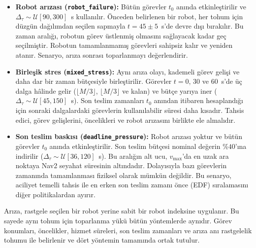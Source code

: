\documentclass[10pt,letterpaper,onecolumn]{IEEEtran}
\begin{document}
\begin{itemize}
  \item \textbf{Robot arızası (\texttt{robot\_failure}):} Bütün görevler
        $t_0$ anında etkinleştirilir ve
        $\Delta_\tau\sim\mathcal U[90,300]$~s kullanılır. Önceden belirlenen
        bir robot, her tohum için düzgün dağılımdan seçilen sapmayla
        $t=45\pm5$~s'de devre dışı bırakılır. Bu zaman aralığı, robotun görev
        üstlenmiş olmasını sağlayacak kadar geç seçilmiştir. Robotun
        tamamlanmamış görevleri sahipsiz kalır ve yeniden atanır. Senaryo,
        arıza sonrası toparlanmayı değerlendirir.

  \item \textbf{Birleşik stres (\texttt{mixed\_stress}):} Aynı arıza olayı,
        kademeli görev gelişi ve daha dar bir zaman bütçesiyle birleştirilir.
        Görevler $t=0$, $30$ ve $60$~s'de üç dalga
        hâlinde gelir ($\lfloor M/3\rfloor$, $\lfloor M/3\rfloor$ ve kalan)
        ve bütçe yarıya iner ($\Delta_\tau\sim\mathcal U[45,150]$~s).
        Son teslim zamanları $t_0$ anından itibaren hesaplandığı için sonraki
        dalgalardaki görevlerin kullanılabilir süresi daha kısadır. Tahsis
        edici, görev gelişlerini, öncelikleri ve robot arızasını birlikte ele
        almalıdır.

  \item \textbf{Son teslim baskısı (\texttt{deadline\_pressure}):} Robot
        arızası yoktur ve bütün görevler $t_0$ anında etkinleştirilir. Son
        teslim bütçesi nominal değerin $\%40$'ına indirilir
        ($\Delta_\tau\sim\mathcal U[36,120]$~s). Bu aralığın alt ucu,
        $v_{\max}$'da en uzak ara noktaya Nav2 seyahat süresinin altındadır.
        Dolayısıyla bazı görevlerin zamanında tamamlanması fiziksel olarak
        mümkün değildir. Bu senaryo, aciliyet temelli tahsis ile en erken son
        teslim zamanı önce (EDF) sıralamasını diğer politikalardan ayırır.
\end{itemize}

Arıza, rastgele seçilen bir robot yerine sabit bir robot indeksine uygulanır.
Bu sayede aynı tohum için toparlanma yükü bütün yöntemlerde aynıdır. Görev
konumları, öncelikler, hizmet süreleri, son teslim zamanları ve arıza anı
rastgelelik tohumu ile belirlenir ve dört yöntemin tamamında ortak tutulur.
\end{document}
